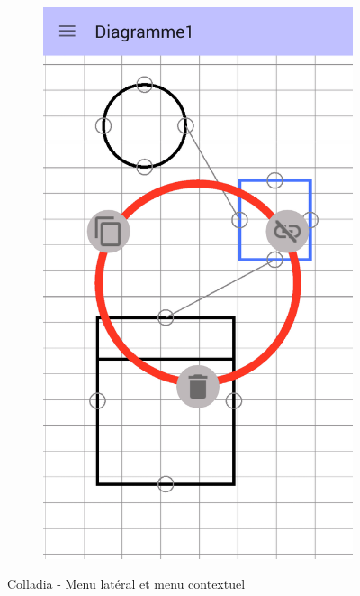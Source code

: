 \begin{itemize}
\begin{figure}[!h]
\begin{subfigure}[t]{.3\textwidth}
				\includegraphics[width=\textwidth]{img/screen/new/colladia_draw_view_menu_contextuel_select}
			\end{subfigure}
			\caption{Colladia - Menu latéral et menu contextuel}
		\end{figure}
		\vspace*{\fill}


\end{itemize}
